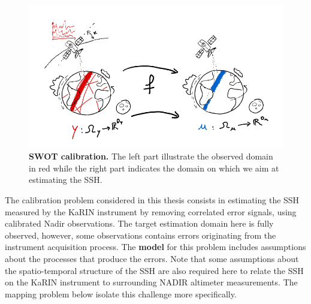 \begin{bibunit}
  \begin{figure}
      \centering
            \includegraphics[width=\linewidth]{Introduction/pics/calib_task.png}    
      \caption{\textbf{SWOT calibration.} The left part illustrate the observed domain in red while the right part indicates the domain on which we aim at estimating the SSH.}
      \label{fig:calibration_task}
  \end{figure}
The calibration problem considered in this thesis consists in estimating the SSH measured by the KaRIN instrument by removing  correlated error signals, using calibrated Nadir observations. The target estimation domain here is fully observed, however, some observations contains errors originating from the instrument acquisition process. The \textbf{model} for this problem includes assumptions about the processes that produce the errors. Note that some assumptions about the spatio-temporal structure of the SSH are also required here to relate the SSH on the KaRIN instrument to surrounding  NADIR altimeter measurements. The mapping problem below isolate this challenge more specifically.


\end{bibunit}
